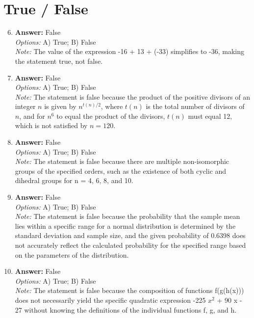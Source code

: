 \documentclass[12pt]{article}
\begin{document}
\section*{True / False}
\begin{enumerate}[label=\arabic*.]
\setcounter{enumi}{5}
\item \textbf{Answer:} False
\\ \textit{Options:} A) True; B) False
\\ \textit{Note:} The value of the expression -16 + 13 + (-33) simplifies to -36, making the statement true, not false.
\item \textbf{Answer:} False
\\ \textit{Options:} A) True; B) False
\\ \textit{Note:} The statement is false because the product of the positive divisors of an integer \( n \) is given by \( n^{t(n)/2} \), where \( t(n) \) is the total number of divisors of \( n \), and for \( n^6 \) to equal the product of the divisors, \( t(n) \) must equal 12, which is not satisfied by \( n = 120 \).
\item \textbf{Answer:} False
\\ \textit{Options:} A) True; B) False
\\ \textit{Note:} The statement is false because there are multiple non-isomorphic groups of the specified orders, such as the existence of both cyclic and dihedral groups for n = 4, 6, 8, and 10.
\item \textbf{Answer:} False
\\ \textit{Options:} A) True; B) False
\\ \textit{Note:} The statement is false because the probability that the sample mean lies within a specific range for a normal distribution is determined by the standard deviation and sample size, and the given probability of 0.6398 does not accurately reflect the calculated probability for the specified range based on the parameters of the distribution.
\item \textbf{Answer:} False
\\ \textit{Options:} A) True; B) False
\\ \textit{Note:} The statement is false because the composition of functions f(g(h(x))) does not necessarily yield the specific quadratic expression -225 $x^2$ + 90 x - 27 without knowing the definitions of the individual functions f, g, and h.
\end{enumerate}
\end{document}
